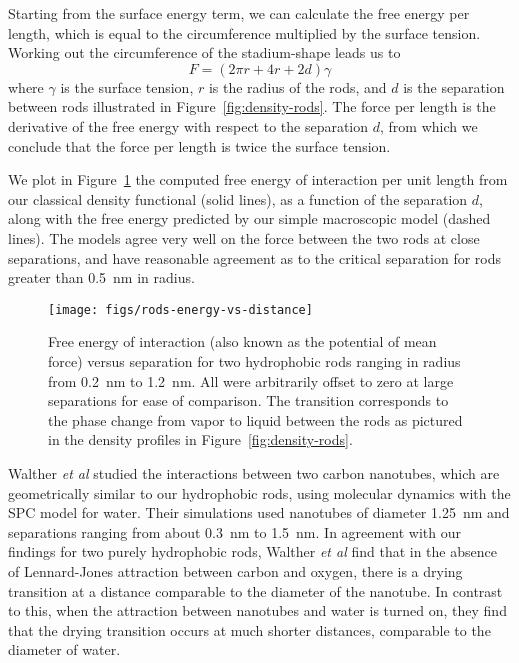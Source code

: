 \documentclass[twocolumn,amsmath,amssymb,prl]{revtex4-1}
\begin{document}
Starting from the surface energy term, we can calculate the 
free energy per length, which is equal to the circumference multiplied 
by the surface tension. 
Working out the circumference of the stadium-shape leads us to
\begin{equation}
F = (2\pi r +4r+2d)\gamma
\end{equation}
where $\gamma$ is the surface tension, $r$ is the radius of the rods,
and $d$ is the separation between rods illustrated in
Figure~\ref{fig:density-rods}.  The force per length is the derivative
of the free energy with respect to the separation $d$, from which we
conclude that the force per length is twice the
surface tension.

We plot in Figure~\ref{fig:rods-energy-vs-distance} the computed free
energy of interaction
per unit length from our classical density functional (solid lines),
as a function of the separation $d$, along with the free energy
predicted by our simple macroscopic model (dashed lines).  The models
agree very well on the force between the two rods at close
separations, and have reasonable agreement as to the critical
separation for rods greater than 0.5~nm in radius.

\begin{figure}
\begin{center}
\texttt{[image: figs/rods-energy-vs-distance]}
\end{center}
\caption{ Free energy of interaction (also known as the potential of mean force)
versus separation for two hydrophobic rods ranging in radius from
0.2~nm to 1.2~nm.
All were arbitrarily offset to zero at large separations for ease of comparison. The
transition corresponds to the phase change from
vapor to liquid between the rods as pictured in the density profiles in 
Figure~\ref{fig:density-rods}. }
\label{fig:rods-energy-vs-distance}
\end{figure}

Walther \emph{et al}\cite{walther2004hydrophobic} studied the
interactions between two carbon nanotubes, which are geometrically
similar to our hydrophobic rods, using molecular dynamics with the SPC
model for water.  Their simulations used nanotubes of diameter 1.25~nm
and separations ranging from about 0.3~nm to 1.5~nm.  In agreement
with our findings for two purely hydrophobic rods, Walther \emph{et
  al} find that in the absence of Lennard-Jones attraction between
carbon and oxygen, there is a drying transition at a distance
comparable to the diameter of the nanotube.  In contrast to this, when
the attraction between nanotubes and water is turned on, they find
that the drying transition occurs at much shorter distances,
comparable to the diameter of water.
\end{document}
